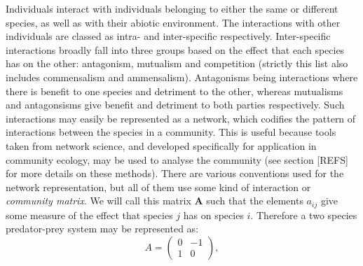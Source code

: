 Individuals interact with individuals belonging to either the same or different species, as well as with their abiotic environment. The interactions with other individuals are classed as intra- and inter-specific respectively. Inter-specific interactions broadly fall into three groups based on the effect that each species has on the other: antagonism, mutualism and competition (strictly this list also includes commensalism and ammensalism). Antagonisms being interactions where there is benefit to one species and detriment to the other, whereas mutualisms and antagonsisms give  benefit and detriment to both parties respectively. Such interactions may easily be represented as a network, which codifies the pattern of interactions between the species in a community. This is useful because tools taken from network science, and developed specifically for application in community ecology, may be used to analyse the community (see section [REFS] for more details on these methods). There are various conventions used for the network representation, but all of them use some kind of interaction or \emph{community matrix}. We will call this matrix $\mathbf{A}$ such that the elements $a_{ij}$ give some measure of the effect that species $j$ has on species $i$. Therefore a two species predator-prey system may be represented as:
\begin{equation}
A = 
\begin{pmatrix}
0 & -1 \\
1 & 0
\end{pmatrix},
\label{eq:example_adj}
\end{equation}

